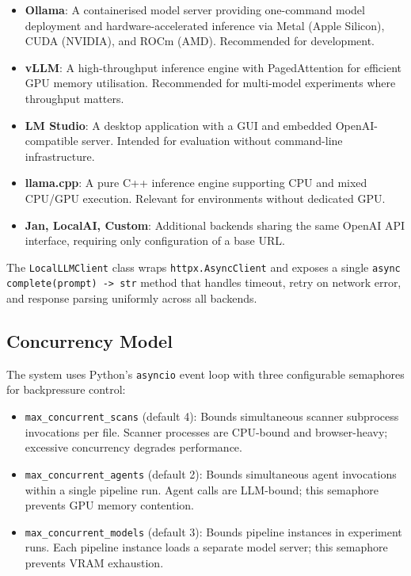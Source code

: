 \begin{itemize}
  \item \textbf{Ollama}: A containerised model server providing one-command
    model deployment and hardware-accelerated inference via Metal (Apple
    Silicon), CUDA (NVIDIA), and ROCm (AMD).  Recommended for development.
  \item \textbf{vLLM}: A high-throughput inference engine with PagedAttention
    for efficient GPU memory utilisation.  Recommended for multi-model
    experiments where throughput matters.
  \item \textbf{LM Studio}: A desktop application with a GUI and embedded
    OpenAI-compatible server.  Intended for evaluation without command-line
    infrastructure.
  \item \textbf{llama.cpp}: A pure C++ inference engine supporting CPU and
    mixed CPU/GPU execution.  Relevant for environments without dedicated GPU.
  \item \textbf{Jan, LocalAI, Custom}: Additional backends sharing the same
    OpenAI API interface, requiring only configuration of a base URL.
\end{itemize}

\noindent
The \texttt{LocalLLMClient} class wraps \texttt{httpx.AsyncClient} and exposes
a single \texttt{async complete(prompt) -> str} method that handles timeout,
retry on network error, and response parsing uniformly across all backends.

\subsection{Concurrency Model}

The system uses Python's \texttt{asyncio} event loop with three configurable
semaphores for backpressure control:

\begin{itemize}
  \item \texttt{max\_concurrent\_scans} (default 4): Bounds simultaneous
    scanner subprocess invocations per file.  Scanner processes are CPU-bound
    and browser-heavy; excessive concurrency degrades performance.
  \item \texttt{max\_concurrent\_agents} (default 2): Bounds simultaneous
    agent invocations within a single pipeline run.  Agent calls are
    LLM-bound; this semaphore prevents GPU memory contention.
  \item \texttt{max\_concurrent\_models} (default 3): Bounds pipeline
    instances in experiment runs.  Each pipeline instance loads a separate
    model server; this semaphore prevents VRAM exhaustion.
\end{itemize}

